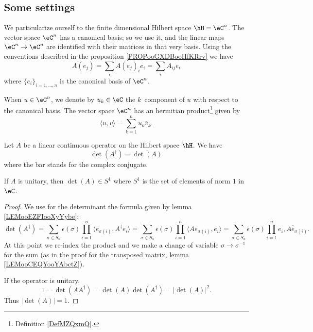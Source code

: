 \subsection{Some settings}

We particularize ourself to the finite dimensional Hilbert space \( \hH=\eC^n\). The vector space \( \eC^n\) has a canonical basis; so we use it, and the linear maps \( \eC^n\to \eC^n\) are identified with their matrices in that very basis. Using the conventions described in the proposition \ref{PROPooGXDBooHfKRrv} we have
\begin{equation}
	A(e_j)=\sum_iA(e_j)_ie_i=\sum_iA_{ij}e_i
\end{equation}
where \( \{ e_i \}_{i=1,\ldots, n}\) is the canonical basis of \( \eC^n\).

When \( u\in \eC^n\), we denote by \( u_k\in \eC\) the \( k\)\ieme\ component of \( u\) with respect to the canonical basis. The vector space \( \eC^n\) has an hermitian product\footnote{Definition \ref{DefMZQxmQ}.} given by
\begin{equation}
	\langle u, v\rangle =\sum_{k=1}^nu_k\bar v_k.
\end{equation}

\begin{lemma}       \label{LEMooKEUZooUjQVmp}
	Let \( A\) be a linear continuous operator on the Hilbert space \( \hH\). We have
	\begin{equation}
		\det(A^{\dag})=\overline{ \det(A) }
	\end{equation}
	where the bar stands for the complex conjugate.

	If \( A\) is unitary, then \( \det(A)\in S^1\) where \( S^1\) is the set of elements of norm \( 1\) in \( \eC\).
\end{lemma}

\begin{proof}
	We use for the determinant the formula given by lemma \ref{LEMooEZFIooXyYybe}:
	\begin{equation}
		\det(A^{\dag})=\sum_{\sigma\in S_n}\epsilon(\sigma)\prod_{i=1}^n\langle e_{\sigma(i)}, A^{\dag}e_i\rangle =  \sum_{\sigma\in S_n}\epsilon(\sigma)\prod_{i=1}^n \langle Ae_{\sigma(i)}, e_i\rangle = \sum_{\sigma\in S_n}\epsilon(\sigma)\prod_{i=1}^n\overline{ e_i,Ae_{\sigma(i)} }.
	\end{equation}
	At this point we re-index the product and we make a change of variable $\sigma\to \sigma^{-1}$ for the sum (as in the proof for the transposed matrix, lemma \ref{LEMooCEQYooYAbctZ}).

	If the operator is unitary,
	\begin{equation}
		1=\det(AA^{\dag})=\det(A)\det(A^{\dag})=| \det(A) |^2.
	\end{equation}
	Thus \( | \det(A) |=1\).
\end{proof}

